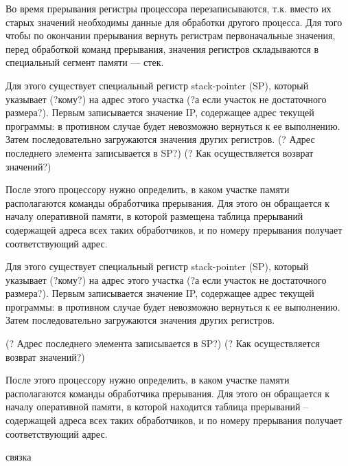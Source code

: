 \documentclass[a4paper, fleqn]{article}
\begin{document}
			Во время прерывания регистры процессора перезаписываются, т.к. вместо их старых значений необходимы данные для обработки другого процесса.   Для того чтобы по окончании прерывания вернуть регистрам первоначальные значения, перед обработкой команд прерывания, значения регистров складываются в специальный сегмент памяти --- стек.
			
			Для этого существует специальный регистр stack-pointer (SP), который указывает (?кому?) на адрес этого участка (?а если участок не достаточного размера?). 
			Первым записывается значение IP, содержащее адрес текущей программы: в противном случае будет невозможно вернуться к ее выполнению. Затем последовательно загружаются значения других регистров.
			(? Адрес последнего элемента записывается в SP?)
			(? Как осуществляется возврат значений?) 
			
			После этого процессору нужно определить, в каком участке памяти располагаются команды обработчика прерывания. Для этого он обращается к началу оперативной памяти, в которой размещена таблица прерываний содержащей адреса всех таких обработчиков, и по номеру прерывания получает соответствующий адрес.
			
			Для этого существует специальный регистр stack-pointer (SP), который указывает (?кому?) на адрес этого участка (?а если участок не достаточного размера?). Первым записывается значение IP, содержащее адрес текущей программы: в противном случае будет невозможно вернуться к ее выполнению. Затем последовательно загружаются значения других регистров.
			
			(? Адрес последнего элемента записывается в SP?)
			(? Как осуществляется возврат значений?)
			 
			После этого процессору нужно определить, в каком участке памяти располагаются команды обработчика прерывания. Для этого он обращается к началу оперативной памяти, в которой находится таблица прерываний – содержащей адреса всех таких обработчиков, и по номеру прерывания получает соответствующий адрес.
			
			связка
\end{document}
